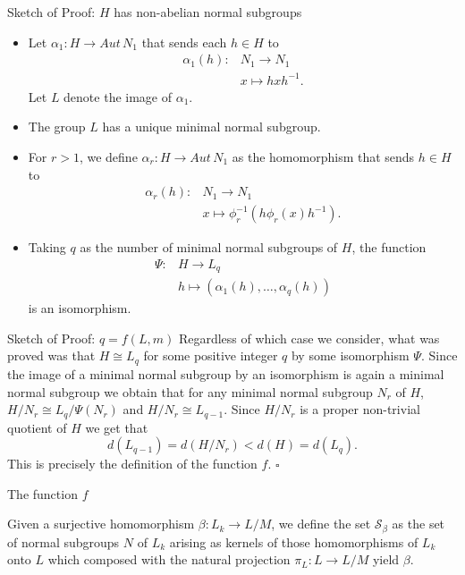 \documentclass{beamer}
\newcommand{\aut}[1]{Aut\, {#1}}
\begin{document}
\begin{frame}{Sketch of Proof: $H$ has non-abelian normal subgroups}
    \begin{itemize}
        \item Let $\alpha_1 \colon H \rightarrow \aut N_1$ that sends each $h \in H$ to
        \begin{align*}
            \alpha_1(h) \colon &N_1 \rightarrow N_1 \\
                            &x \mapsto hxh^{-1}.
        \end{align*} Let $L$ denote the image of $\alpha_1$.
        \item<2-> The group $L$ has a unique minimal normal subgroup.
        \item<3-> For $r > 1$, we define $\alpha_r \colon H \rightarrow \aut N_1$ as the homomorphism that sends $h \in H$ to
        \begin{align*}
            \alpha_r(h) \colon &N_1 \rightarrow N_1 \\
                            &x \mapsto \phi_r^{-1}(h\phi_r(x)h^{-1}).
        \end{align*}
        \item<4-> Taking $q$ as the number of minimal normal subgroups of $H$, the function
        \begin{align*}
            \Psi \colon &H \rightarrow L_q \\
                        &h \mapsto (\alpha_1(h),\ldots , \alpha_q(h))
        \end{align*}
        is an isomorphism.
    \end{itemize}
\end{frame}

\begin{frame}{Sketch of Proof: $q = f(L, m)$}
    Regardless of which case we consider, what was proved was that $H \cong L_q$ for some positive integer $q$ by some isomorphism $\Psi$. Since the image of a minimal normal subgroup by an isomorphism is again a minimal normal subgroup we obtain that for any minimal normal subgroup $N_r$ of $H$, $H/N_r \cong L_{q}/\Psi(N_r)$ and $H/N_r \cong L_{q-1}$. Since $H/N_r$ is a proper non-trivial quotient of $H$ we get that
    $$
    d(L_{q-1}) = d(H/N_r) < d(H) = d(L_q).
    $$
    This is precisely the definition of the function $f$. $\square$


\end{frame}

\begin{frame}{The function $f$}
    \begin{definition}
        Given a surjective homomorphism $\beta \colon L_k \rightarrow L/M$, we define the set $\mathscr{S}_\beta$ as the set of normal subgroups $N$ of $L_k$ arising as kernels of those homomorphisms of $L_k$ onto $L$ which composed with the natural projection $\pi_L \colon L \rightarrow L/M$ yield $\beta$.
    \end{definition}
    
\end{frame}
\end{document}
